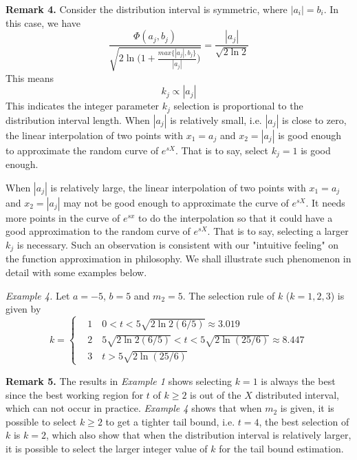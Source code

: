\documentclass[journal]{IEEEtran}
\begin{document}
\textbf{Remark 4.}
Consider the distribution interval is symmetric, where $|a_i|=b_i$. In this case, we have
\begin{equation}
\frac{\Phi(a_j,b_j)}{\sqrt{2\ln\big(1+\frac{max\{|a_j|,b_j\}}{|a_j|}\big) }}=\frac{|a_j|}{\sqrt{2\ln2}}
\end{equation}
This means
\begin{equation}
k_j \propto |a_j|
\end{equation}
This indicates the integer parameter $k_j$ selection is proportional to the distribution interval length. When $|a_j|$ is relatively small, i.e. $|a_j|$ is close to zero, the linear interpolation of two points with $x_1=a_j$ and $x_2=|a_j|$ is good enough to approximate the random curve of $e^{sX}$. That is to say, select $k_j=1$ is good enough.

When  $|a_j|$ is relatively large, the linear interpolation of two points with $x_1=a_j$ and $x_2=|a_j|$ may not be good enough to approximate the curve of $e^{sX}$. It needs more points in the curve of $e^{sx}$ to do the interpolation so that it could have a good approximation to the random curve of $e^{sX}$. That is to say, selecting a larger $k_j$ is necessary.  Such an observation is consistent with our "intuitive feeling" on the function approximation in philosophy.  We shall illustrate such phenomenon in detail with some examples below.

\emph{Example 4.} Let $a= -5$, $b=5$ and $m_2=5$.  The selection  rule of $k$ ($k=1,2,3$) is given by
\begin{equation}
k=
\begin{cases}
{}&1 \quad 0<t< 5\sqrt{2\ln2(6/5)}\approx 3.019 {} \\
 & 2 \quad  5\sqrt{2\ln2(6/5)} <t< 5\sqrt{2\ln (25/6)}\approx 8.447\\
 & 3 \quad  t > 5\sqrt{2\ln (25/6)}
\end{cases}
\end{equation}

\textbf{Remark 5.}
 The results in \emph{Example 1} shows selecting $k=1$ is always the best since the best working region for $t$  of $k \geq 2$ is out of the $X$ distributed interval, which can not occur in practice. \emph{Example 4} shows that when $m_2$ is given, it is possible to select $k\geq 2$ to get a tighter tail bound, i.e. $t=4$, the best selection of $k$ is $k=2$, which also show that when the distribution interval is relatively larger, it is possible to select the larger integer value of $k$ for the tail bound estimation.
\end{document}

